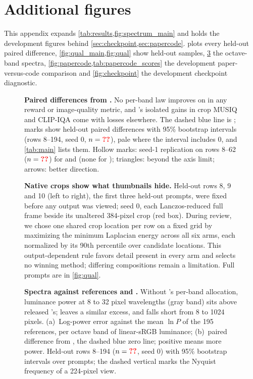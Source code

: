 \section{Additional figures}\label{app:figs}

This appendix expands \cref{tab:results,fig:spectrum_main} and holds the development figures behind \cref{sec:checkpoint,sec:papercode}.  plots every held-out paired difference, \cref{fig:qual_main,fig:qual} show held-out samples, \cref{fig:spectrum} the octave-band spectra, \cref{fig:papercode,tab:papercode_scores} the development paper-versus-code comparison and \cref{fig:checkpoint} the development checkpoint diagnostic.

\begin{figure}[H]
\centering
{}
\caption{\textbf{Paired differences from \segaofficial.} No per-band law improves on \segaofficial{} in any reward or image-quality metric, and \dype's isolated gains in crop MUSIQ and CLIP-IQA come with losses elsewhere. The dashed blue line is \segaofficial; marks show held-out paired differences with 95\% bootstrap intervals (rows 8--194, seed 0, $n=\N{ho@nprompts}$), pale where the interval includes 0, and \cref{tab:main} lists them. Hollow marks: seed-1 replication on rows 8--62 ($n=\N{so@n@tsb}$) for \tempsb{} and \constancytm{} (none for \segactm); triangles: \ntk{} beyond the axis limit; arrows: better direction.}
\label{fig:forest}
\end{figure}

\begin{figure}[H]
\centering
{}
\caption{\textbf{Native crops show what thumbnails hide.} Held-out rows 8, 9 and 10 (left to right), the first three held-out prompts, were fixed before any output was viewed; seed 0, each Lanczos-reduced full frame beside its unaltered 384-pixel crop (red box). During review, we chose one shared crop location per row on a fixed grid by maximizing the minimum Laplacian energy across all six arms, each normalized by its 90th percentile over candidate locations. This output-dependent rule favors detail present in every arm and selects no winning method; differing compositions remain a limitation. Full prompts are in \cref{fig:qual}.}
\label{fig:qual_main}
\end{figure}

\begin{figure}[H]
\centering
{}
\caption{\textbf{Spectra against references and \sega.} Without \sega's per-band allocation, luminance power at 8 to 32 pixel wavelengths (gray band) sits above released \sega's; \constancytm{} leaves a similar excess, and \ntk{} falls short from 8 to 1024 pixels. (a)~Log-power error against the mean $\ln P$ of the 195 \afk{} references, per octave band of linear-sRGB luminance; (b)~paired difference from \segaofficial, the dashed blue zero line; positive means more power. Held-out rows 8--194 ($n=\N{ho@nprompts}$, seed 0) with 95\% bootstrap intervals over prompts; the dashed vertical marks the Nyquist frequency of a 224-pixel view.}
\label{fig:spectrum}
\end{figure}

